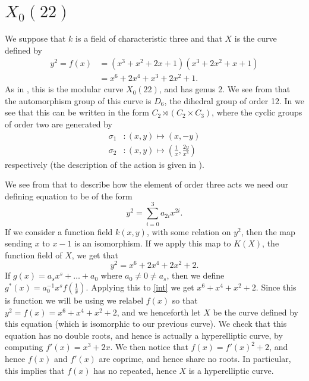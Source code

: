 \documentclass[draft, 11pt]{article} %
\theoremstyle{plain}
\theoremstyle{remark}
\begin{document}
\section{$X_0(22)$}

We suppose that $k$ is a field of characteristic three and that $X$ is the curve defined by
\begin{align*}
y^2 = f(x)  & = (x^3 + x^2 + 2x + 1)(x^3 + 2x^2 + x + 1)\\
& = x^6 + 2x^4 + x^3 + 2x^2 + 1.
\end{align*}
As in \cite[Table 2]{automorphismshyperellipticmodular}, this is the modular curve $X_0(22)$, and has genus 2.
We see from \cite[Table 1]{automorphismshyperellipticmodular} that the automorphism group of this curve is $D_6$, the dihedral group of order 12.
In \cite[\S 3.3]{automorphismshyperellipticmodular} we see that this can be written in the form $C_2 \rtimes (C_2 \times C_3)$, where the cyclic groups of order two are generated by
\begin{align*}
\sigma_1 & \colon (x,y) \mapsto (x,-y) \\
\sigma_2 & \colon (x,y) \mapsto \left( \frac{1}{x}, \frac{2y}{x^3} \right)
\end{align*}
respectively (the description of the action is given in \cite[Table 1]{automorphismshyperellipticmodular}).

We see from \cite[\S 3.3]{automorphismshyperellipticmodular} that to describe how the element of order three acts we need our defining equation to be of the form
\[
y^2 = \sum_{i=0}^3 a_{2i}x^{2i}.
\]
If we consider a function field $k(x,y)$, with some relation on $y^2$, then the map sending $x$ to $x-1$ is an isomorphism.
If we apply this map to $K(X)$, the function field of $X$, we get that
\begin{equation}\label{int}
y^2 = x^6 + 2x^4 + 2x^2 + 2.
\end{equation}
If $g(x) = a_sx^s + \ldots + a_0$ where $a_0 \neq 0 \neq a_s$, then we define $g^*(x) = a_0^{-1}x^sf\left( \frac{1}{x} \right)$.
Applying this to \eqref{int} we get $x^6 + x^4 + x^2 + 2$.
Since this is function we will be using we relabel $f(x)$ so that $y^2 = f(x) = x^6 + x^4 + x^2 + 2$, and we henceforth let $X$ be the curve defined by this equation (which is isomorphic to our previous curve).
We check that this equation has no double roots, and hence is actually a hyperelliptic curve, by computing $f'(x) = x^3 + 2x$. 
We then notice that $f(x) = f'(x)^2 + 2$, and hence $f(x)$ and $f'(x)$ are coprime, and hence share no roots.
In particular, this implies that $f(x)$ has no repeated, hence $X$ is a hyperelliptic curve.
\end{document}
